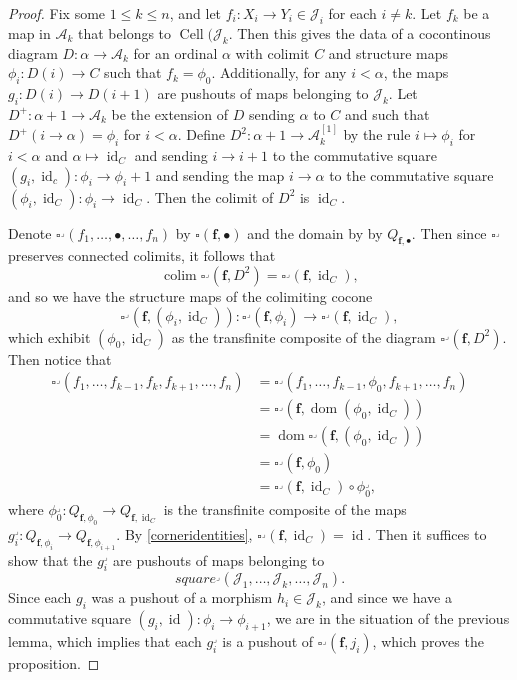 \documentclass{amsart}
\numberwithin{equation}{section}
\theoremstyle{plain}   %
\theoremstyle{remark}
\theoremstyle{plain}
\DeclareMathOperator{\id}{id}
\DeclareMathOperator{\colim}{colim}
\begin{document}
\begin{proof}
	Fix some \(1\leq k\leq n\), and let \(f_i:X_i\to Y_i \in \mathscr{J}_i\) for each \(i\neq k\). 
	Let \(f_k\) be a map in \(\mathcal{A}_k\) that belongs to \(\operatorname{Cell}(\mathscr{J}_k\).  Then this gives the data of a cocontinous diagram \(D:\alpha \to \mathcal{A}_k\) for an ordinal \(\alpha\) with colimit \(C\) and structure maps \(\phi_i: D(i)\to C\) such that \(f_k=\phi_0\).  Additionally, for any \(i <\alpha\), the maps \(g_i:D(i)\to D(i+1)\) are pushouts of maps belonging to \(\mathscr{J}_k\). Let \(D^+:\alpha+1\to \mathcal{A}_k\) be the extension of \(D\) sending \(\alpha\) to \(C\) and such that \(D^+(i\to \alpha)=\phi_i\) for \(i<\alpha\).  Define \(D^2: \alpha+1\to \mathcal{A}_k^{[1]}\) by the rule \(i\mapsto \phi_i\) for \(i<\alpha\) and \(\alpha\mapsto \id_C\) and sending \(i\to i+1\) to the commutative square \((g_i,\id_c):\phi_i\to \phi_i+1\) and sending the map \(i\to \alpha\) to the commutative square \((\phi_i,\id_C):\phi_i\to \id_C\).  Then the colimit of \(D^2\) is \(\id_C\).  

	Denote \(\square^\lrcorner(f_1,\dots,\bullet,\dots, f_n)\) by \(\square(\mathbf{f},\bullet)\) and the domain by by \(Q_{\mathbf{f},\bullet}\).  Then since \(\square^\lrcorner\) preserves connected colimits, it follows that 
	\[\colim\square^\lrcorner(\mathbf{f},D^2)=\square^\lrcorner(\mathbf{f},\id_C),\]
	and so we have the structure maps of the colimiting cocone
	\[\square^\lrcorner(\mathbf{f},(\phi_i,\id_C)): \square^\lrcorner(\mathbf{f},\phi_i) \to \square^\lrcorner(\mathbf{f},\id_C),\]
	which exhibit \((\phi_0,\id_C)\) as the transfinite composite of the diagram \(\square^\lrcorner(\mathbf{f},D^2)\).  
	Then notice that
	\begin{align*}
		\square^\lrcorner(f_1,\dots,f_{k-1},f_k,f_{k+1},\dots,f_n)&=\square^\lrcorner(f_1,\dots,f_{k-1},\phi_0,f_{k+1},\dots,f_n)\\
		&=\square^\lrcorner(\mathbf{f},\operatorname{dom}(\phi_0,\id_C))\\
		&=\operatorname{dom}\square^\lrcorner(\mathbf{f},(\phi_0,\id_C))\\
		&=\square^\lrcorner(\mathbf{f},\phi_0)\\
		&=\square^\lrcorner(\mathbf{f},\id_C)\circ \phi_0^\lrcorner,
	\end{align*}
	where \(\phi_0^\lrcorner:Q_{\mathbf{f},\phi_0}\to Q_{\mathbf{f},\id_C}\) is the transfinite composite of the maps \(g_i^\lrcorner: Q_{\mathbf{f},\phi_i} \to Q_{\mathbf{f},\phi_{i+1}}\).  By \ref{corneridentities}, \(\square^\lrcorner(\mathbf{f},\id_C)= \id\).  Then it suffices to show that the \(g_i^\lrcorner\) are pushouts of maps belonging to 
	\[square^\lrcorner(\mathscr{J}_1,\dots, \mathscr{J}_k,\dots ,\mathscr{J}_n).\]
	Since each \(g_i\) was a pushout of a morphism \(h_i \in \mathscr{J}_k\), and since we have a commutative square \((g_i,\id):\phi_i\to \phi_{i+1}\), we are in the situation of the previous lemma, which implies that each \(g_i^\lrcorner\) is a pushout of \(\square^\lrcorner(\mathbf{f},j_i)\), which proves the proposition.
\end{proof}
\end{document}
